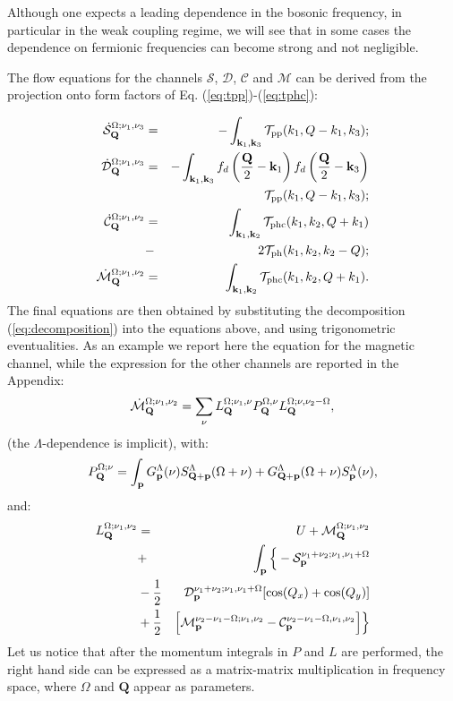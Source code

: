 Although one expects a leading dependence in the bosonic frequency, 
in particular in the weak coupling regime, we will see that in some cases the dependence on fermionic frequencies can become strong and not negligible.

The flow equations for the channels $\mathcal{S}$,  $\mathcal{D}$, $\mathcal{C}$ and $\mathcal{M}$ can be derived from the projection onto form factors of Eq. (\ref{eq:tpp})-(\ref{eq:tphc}):

\begin{eqnarray}
\dot{\mathcal{S}}_{\mathbf{Q}}^{\Omega;\nu_1,\nu_3}  &=& - \int _{\mathbf{k}_1, \mathbf{k}_3 } \mathcal{T}_{\mathrm{pp}}(k_1,Q-k_1,k_3); \\ 
\dot{\mathcal{D}}_{\mathbf{Q}}^{\Omega;\nu_1,\nu_3}  &=& -
\int _{\mathbf{k}_1,\mathbf{k}_3}  f_d\left( {\frac{\mathbf{Q}}{2} - \mathbf{k}_1} \right ) f_d\left ({\frac{\mathbf{Q}}{2} - \mathbf{k}_3} \right)  \nonumber \\ 
 &&\mathcal{T}_{\mathrm{pp}}(k_1,Q-k_1,k_3) ; 
\\
\nonumber
\dot{\mathcal{C}}_{\mathbf{Q}}^{\Omega;\nu_1,\nu_2} &=& 
\int _{\mathbf{k}_1,\mathbf{k}_2}   \mathcal{T}_{\mathrm{phc}}(k_1,k_2,Q+k_1)\\ &-&2\mathcal{T}_{\mathrm{ph}}(k_1,k_2,k_2-Q) ; 
\\ 
\dot{\mathcal{M}}_{\mathbf{Q}}^{\Omega;\nu_1,\nu_2} & =& 
\int _{\mathbf{k}_1,\mathbf{k}_2}  \mathcal{T}_{\mathrm{phc}}(k_1,k_2,Q+k_1). 
\end{eqnarray}
The final equations are then obtained by substituting the decomposition (\ref{eq:decomposition}) into the equations above, and using trigonometric eventualities.
As an example we report here the equation for the magnetic channel, while the expression for the other channels are reported in the Appendix: 
\begin{equation}
\dot{\mathcal{M}}_{\mathbf{Q}}^{\Omega;\nu_1,\nu_2} = \sum_{\nu} L^{\Omega; \nu_1,\nu}_{\mathbf{Q}} P_{\mathbf{Q}}^{\Omega,\nu} L^{\Omega; \nu,\nu_2-\Omega}_{\mathbf{Q}}, 
\end{equation} 	   
(the $\Lambda$-dependence is implicit), with: 
\begin{equation}
P_{\mathbf{Q}}^{\Omega;\nu} = \int_{\mathbf{p}}  G^\Lambda_{\mathbf{p}}(\nu)S^\Lambda_{\mathbf{Q}+\mathbf{p}}
(\Omega+\nu) +G^\Lambda_{\mathbf{Q}+\mathbf{p}}(\Omega+\nu)
S^\Lambda_{\mathbf{p}} (\nu), 
\end{equation} 
and: 
\begin{eqnarray} 
\nonumber
L^{\Omega;\nu_1,\nu_2}_{\mathbf{Q}}&=&U+\mathcal{M}_{\mathbf{Q}}^{\Omega;\nu_1,\nu_2} \\
\nonumber 
&+& \int_{\mathbf{p}} \Big \{- \mathcal{S}_{\mathbf{p}}^{\nu_1+\nu_2;\nu_1,\nu_1+\Omega}  
 \\
 \nonumber 
&-\frac{1}{2}& \mathcal{D}_{\mathbf{p}}^{\nu_1+\nu_2;\nu_1,\nu_1+\Omega}
[\cos(Q_x)+\cos(Q_y)]
 \\ 
&+\frac{1}{2}& \Big[  \mathcal{M}_{\mathbf{p}}^{\nu_2-\nu_1-\Omega; \nu_1,\nu_2} 
- \mathcal{C}_{\mathbf{p}}^{\nu_2-\nu_1-\Omega,\nu_1,\nu_2} \Big] 
\Big \} 
\end{eqnarray}	 
Let us notice that after the momentum integrals in $P$ and $L$ are performed, the right hand side can be expressed as a matrix-matrix multiplication in frequency space, where $\Omega$ and $\mathbf{Q}$ appear as parameters.

